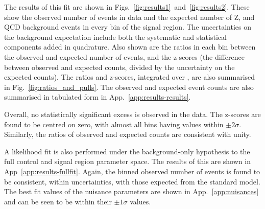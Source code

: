 The results of this fit are shown in 
Figs.~\ref{fig:results1}~and~\ref{fig:results2}.
These show the observed number of events in data and the expected number of 
Z, \ttw and QCD background events in every \njnbhtmht bin of the signal 
region. The uncertainties on the background expectation include both the 
systematic and statistical components added in quadrature. 
Also shown are the ratios in each bin between the observed and expected number 
of events, and the z-scores (the difference between observed and expected 
counts, divided by the uncertainty on the expected counts).
The ratios and z-scores, integrated over \mht, are also summarised in 
Fig.~\ref{fig:ratios_and_pulls}.
The observed and expected event counts are also summarised in tabulated form in 
App.~\ref{app:results-results}.

Overall, no statistically significant excess is observed in the data.
The z-scores are found to be centred on zero, with almost all bins having 
values within $\pm2\sigma$.
Similarly, the ratios of observed and expected counts are consistent with unity.

A likelihood fit is also performed under the background-only hypothesis to the 
full control and signal region parameter space. The results of this are shown 
in App~\ref{app:results-fullfit}.
Again, the binned observed number of events is found to be consistent, within 
uncertainties, with those expected from the standard model. The best fit values 
of the nuisance parameters are shown in App.~\ref{app:nuisances} and can be 
seen to be within their $\pm1\sigma$ values.


